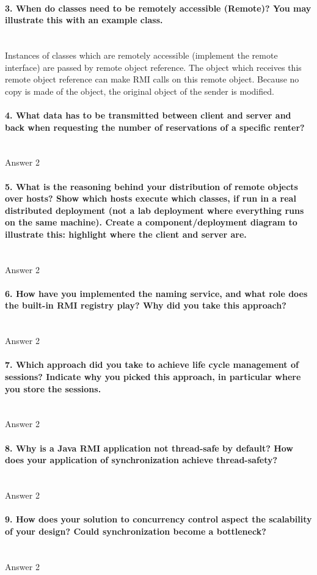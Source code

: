 \documentclass{ds-report}
\begin{document}
	\paragraph{3. When do classes need to be remotely accessible (Remote)? You may illustrate this with an example
class.} \mbox{}\\
Instances of classes which are remotely accessible (implement the remote interface) are passed by remote object reference. The object which receives this remote object reference can make RMI calls on this remote object. Because no copy is made of the object, the original object of the sender is modified. 

	\paragraph{4. What data has to be transmitted between client and server and back when requesting the number
of reservations of a specific renter?} \mbox{}\\
	Answer 2

	\paragraph{5. What is the reasoning behind your distribution of remote objects over hosts? Show which
hosts execute which classes, if run in a real distributed deployment (not a lab deployment where
everything runs on the same machine). Create a component/deployment diagram to illustrate this:
highlight where the client and server are.} \mbox{}\\
	Answer 2

	\paragraph{6. How have you implemented the naming service, and what role does the built-in RMI registry play?
Why did you take this approach?} \mbox{}\\
	Answer 2

	\paragraph{7. Which approach did you take to achieve life cycle management of sessions? Indicate why you
picked this approach, in particular where you store the sessions.} \mbox{}\\
	Answer 2

	\paragraph{8. Why is a Java RMI application not thread-safe by default? How does your application of synchronization achieve thread-safety?} \mbox{}\\
	Answer 2

	\paragraph{9. How does your solution to concurrency control aspect the scalability of your design? Could
synchronization become a bottleneck?} \mbox{}\\
	Answer 2

	
	\clearpage
	
	
\end{document}
